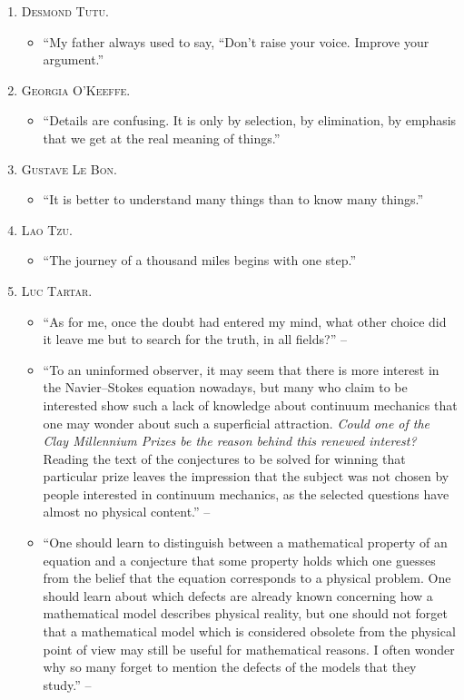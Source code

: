 \documentclass[oneside]{book}
\numberwithin{equation}{section}
\begin{document}
\begin{enumerate}
	\item \textsc{Desmond Tutu.}
	\begin{itemize}
		\item ``My father always used to say, ``Don't raise your voice. Improve your argument.''
	\end{itemize}
	\item \textsc{Georgia O'Keeffe.}
	\begin{itemize}
		\item ``Details are confusing. It is only by selection, by elimination, by emphasis that we get at the real meaning of things.''
	\end{itemize}
	\item \textsc{Gustave Le Bon.}
	\begin{itemize}
		\item ``It is better to understand many things than to know many things.''
	\end{itemize}
	\item \textsc{Lao Tzu.}
	\begin{itemize}
		\item ``The journey of a thousand miles begins with one step.''
	\end{itemize}
	\item \textsc{Luc Tartar.}
	\begin{itemize}
		\item ``As for me, once the doubt had entered my mind, what other choice did it leave me but to search for the truth, in all fields?'' -- \cite{Tartar2006}
		\item ``To an uninformed observer, it may seem that there is more interest in the Navier--Stokes equation nowadays, but many who claim to be interested show such a lack of knowledge about continuum mechanics that one may wonder about such a superficial attraction. \textit{Could one of the Clay Millennium Prizes be the reason behind this renewed interest?} Reading the text of the conjectures to be solved for winning that particular prize leaves the impression that the subject was not chosen by people interested in continuum mechanics, as the selected questions have almost no physical content.'' -- \cite[Preface, p. vii]{Tartar2006}		
		\item ``One should learn to distinguish between a mathematical property of an equation and a conjecture that some property holds which one guesses from the belief that the equation corresponds to a physical problem. One should learn about which defects are already known concerning how a mathematical model describes physical reality, but one should not forget that a mathematical model which is considered obsolete from the physical point of view may still be useful for mathematical reasons. I often wonder why so many forget to mention the defects of the models that they study.'' -- \cite[Preface, p. vii]{Tartar2006}		

\end{itemize}
\end{enumerate}
\end{document}
